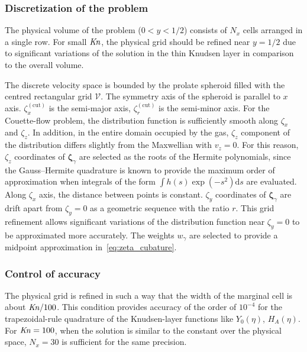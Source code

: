 \documentclass[final]{jfm} %
\newcommand{\Kn}{\mbox{\textit{Kn}}}
\newcommand{\dd}{\mathrm{d}}
\newcommand{\bzeta}{\boldsymbol{\zeta}}
\begin{document}
\subsubsection{Discretization of the problem}

The physical volume of the problem (\(0<y<1/2\)) consists of \(N_x\) cells arranged in a single row.
For small \(\Kn\), the physical grid should be refined near \(y=1/2\)
due to significant variations of the solution in the thin Knudsen layer in comparison to the overall volume.

The discrete velocity space is bounded by the prolate spheroid
filled with the centred rectangular grid \(\mathcal{V}\).
The symmetry axis of the spheroid is parallel to \(x\) axis.
\(\zeta^{(\mathrm{cut})}_x\) is the semi-major axis, \(\zeta^{(\mathrm{cut})}_r\) is the semi-minor axis.
For the Couette-flow problem, the distribution function is sufficiently smooth along \(\zeta_x\) and \(\zeta_z\).
In addition, in the entire domain occupied by the gas, \(\zeta_z\) component of the distribution
differs slightly from the Maxwellian with \(v_z=0\).
For this reason, \(\zeta_z\) coordinates of \(\bzeta_\gamma\) are selected as the roots of the Hermite polynomials,
since the Gauss--Hermite quadrature is known to provide the maximum order of approximation
when integrals of the form \(\int h(s)\exp(-s^2)\dd{s}\) are evaluated.
Along \(\zeta_x\) axis, the distance between points is constant.
\(\zeta_y\) coordinates of \(\bzeta_\gamma\) are drift apart from \(\zeta_y=0\)
as a geometric sequence with the ratio \(r\).
This grid refinement allows significant variations of the distribution function
near \(\zeta_y=0\) to be approximated more accurately.
The weights \(w_\gamma\) are selected to provide a midpoint approximation in~\eqref{eq:zeta_cubature}.

\subsubsection{Control of accuracy}

The physical grid is refined in such a way
that the width of the marginal cell is about \(\Kn/100\).
This condition provides accuracy of the order of \(10^{-4}\) for the trapezoidal-rule quadrature
of the Knudsen-layer functions like \(Y_0(\eta)\), \(H_A(\eta)\).
For \(\Kn=100\), when the solution is similar to the constant over the physical space,
\(N_x = 30\) is sufficient for the same precision.
\end{document}
